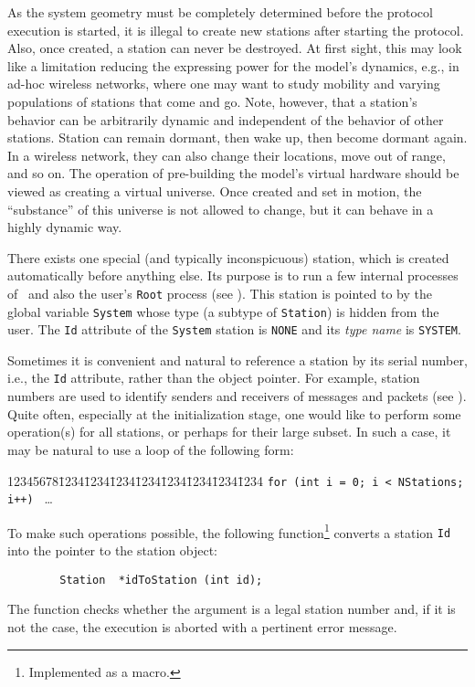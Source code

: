 As the system geometry must be completely determined before the protocol
execution is started, it is illegal to create new stations after starting
the protocol.
Also, once created, a station can never be destroyed.
At first sight, this may look like a limitation reducing the expressing power
for the model's dynamics, e.g., in ad-hoc wireless networks, where one may
want to study mobility and varying populations of stations that come and go.
Note, however, that a station's behavior can be arbitrarily dynamic and
independent of the behavior of other stations.
Station can remain dormant, then wake up, then become dormant again.
In a wireless network, they can also change their locations, move out of range,
and so on.
The operation of pre-building the model's virtual hardware should be viewed as
creating a virtual universe.
Once created and set in motion, the ``substance'' of this universe is not
allowed to change, but it can behave in a highly dynamic way.

There exists one special (and typically inconspicuous) station,
which is created automatically before anything else.
Its purpose is to run a few internal processes
of \smurph\ and also the user's {\tt Root} process (see ).
This station is pointed to by the global variable {\tt System} whose
type (a subtype of {\tt Station}) is hidden from the user.
The {\tt Id} attribute of the {\tt System} station is {\tt NONE} and its
{\em type name\/} is {\tt SYSTEM}.

Sometimes it is convenient and natural to reference a station by its
serial number, i.e., the {\tt Id} attribute, rather than the object pointer.
For example, station numbers are used to identify senders and receivers
of messages and packets (see ).
Quite often, especially at the initialization stage, one would like to perform
some operation(s) for all stations, or perhaps for their large subset.
In such a case, it may be natural to use a loop of the following form:
{\tt\begin{tabbing}
12345678\=1234\=1234\=1234\=1234\=1234\=1234\=1234\=1234\kill
 \> {\tt for (int i = 0; i < NStations; i++) } \ldots
\end{tabbing}}
To make such operations possible,
the following function\footnote{Implemented as a macro.} converts a
station {\tt Id} into the pointer to the station object:
\begin{verbatim}
        Station  *idToStation (int id);
\end{verbatim}
The function checks whether the argument is a legal station number and, if it
is not the case, the execution is aborted with a pertinent error message.

